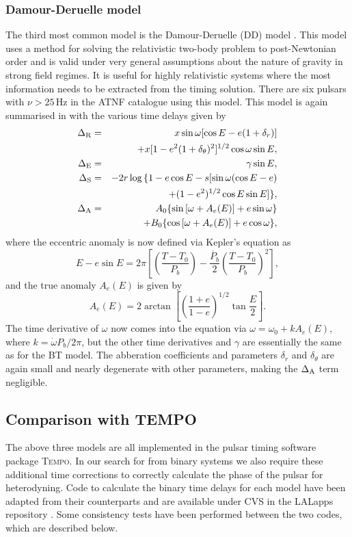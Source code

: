 \subsubsection{Damour-Deruelle model}
The third most common model is the Damour-Deruelle (DD) model \cite{DamourDeruelle:1986}. This
model uses a method for solving the relativistic two-body problem to post-Newtonian order and is
valid under very general assumptions about the nature of gravity in strong field regimes. It is
useful for highly relativistic systems where the most information needs to be extracted from the
timing solution. There are six pulsars with $\nu >25$\,Hz in the ATNF catalogue using this model.
This model is again summarised in \cite{TaylorWeisberg:1989} with the various time delays given by
\begin{eqnarray}\label{DDdelays}
\Delta_{\rm{R}} & = & x\sin{\omega} [\cos{E} - e(1 + \delta_r)] \nonumber \\ 
 & & + x[1 - e^2(1 + \delta_{\theta})^2]^{1/2} \cos{\omega} \sin{E}, \\
\Delta_{\rm{E}} & = & \gamma\sin{E}, \\
\Delta_{\rm{S}} & = & -2r\log{}\{1 - e\cos{E} - s [\sin{\omega} (\cos{E} - e) \nonumber \\
 & & + (1-e^2)^{1/2} \cos{E} \sin{E}]\}, \\
\Delta_{\rm{A}} & = & A_0\{\sin{[\omega + A_e(E)]} + e\sin{\omega}\} \nonumber \\
& & + B_0\{\cos{[\omega + A_e(E)]} + e\cos{\omega}\},
\end{eqnarray}
where the eccentric anomaly is now defined via Kepler's equation as
\begin{equation}
E -  e\sin{E} = 2\pi\left[\left(\frac{T-T_0}{P_b}\right) -
\frac{\dot{P_b}}{2}\left(\frac{T-T_0}{P_b}\right)^2\right],
\end{equation}
and the true anomaly $A_e(E)$ is given by
\begin{equation}
A_e(E) = 2\arctan{\left[\left(\frac{1+e}{1-e}\right)^{1/2}\tan{\frac{E}{2}}\right]}.
\end{equation}
The time derivative of $\omega$ now comes into the equation via $\omega = \omega_0 + kA_e(E)$, where
$k = \dot{\omega}P_b/2\pi$, but the other time derivatives and $\gamma$ are essentially the same as
for the BT model. The abberation coefficients and parameters $\delta_r$ and $\delta_{\theta}$ are
again small and nearly degenerate with other parameters, making the $\Delta_{\rm{A}}$ term
negligible.

\subsection{Comparison with TEMPO}
The above three models are all implemented in the pulsar timing software package T\textsc{empo}. In
our search for \gws from binary systems we also require these additional time corrections to
correctly calculate the phase of the pulsar for heterodyning. Code to calculate the binary time
delays for each model have been adapted from their \tempo counterparts and are available under CVS
in the LALapps repository \cite{LALapps}. Some consistency tests have been performed between the two
codes, which are described below.

